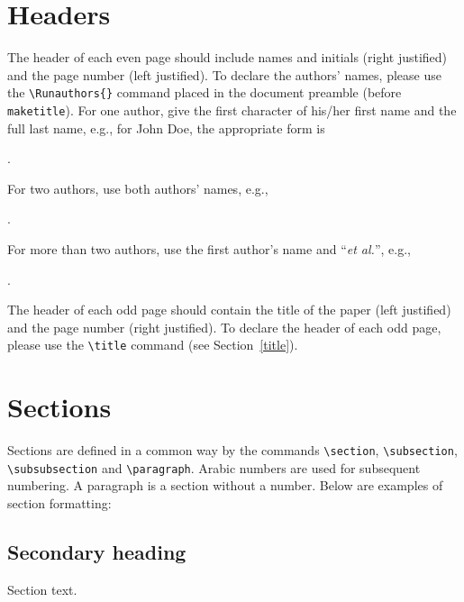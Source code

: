 \documentclass{amcs}
\begin{document}
\section{Headers}
The header of each even page should include names and initials (right justified) and the page number (left justified). To declare the authors' names, please use the \verb+\Runauthors{}+ command placed in the document preamble (before \verb+maketitle+). For one author, give the first character of his/her first name and the full last name, e.g., for John Doe, the appropriate form is

\medskip{}.

\medskip\noindent
For two authors, use both authors' names, e.g.,

\medskip{}.

\medskip\noindent For more than two authors, use the first author's name and ``\emph{et al.}'', e.g.,

\medskip{}.

\medskip The header of each odd page should contain the title of the paper (left justified) and the page number (right justified). To declare the header of each odd page, please use the {\small \verb+\title+} command (see Section~\ref{title}).

\section{Sections}
Sections are defined in a common way by the commands \verb+\section+, \verb+\subsection+, \verb+\subsubsection+ and \verb+\paragraph+. Arabic numbers are used for subsequent numbering. A paragraph is a section without a number. Below are examples of section formatting:

\subsection{Secondary heading} Section text.
\end{document}
